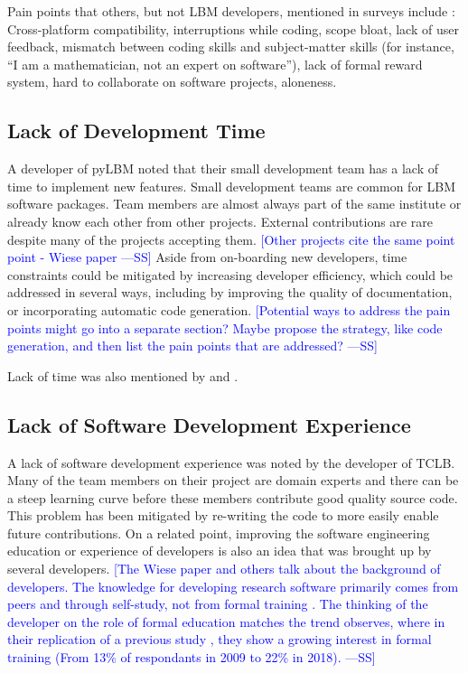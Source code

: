 \documentclass[final, 3p, times, authoryear]{elsarticle}
\newcommand{\authornote}[3]{\textcolor{#1}{[#3 ---#2]}}
\newcommand{\authornote}[3]{}
\newcommand{\wss}[1]{\authornote{blue}{SS}{#1}} %
\begin{document}
Pain points that others, but not LBM developers, mentioned in surveys include
\citep{PintoEtAl2018}: Cross-platform compatibility, interruptions while coding,
scope bloat, lack of user feedback, mismatch between coding skills and
subject-matter skills (for instance, ``I am a mathematician, not an expert on
software''), lack of formal reward system, hard to collaborate on software
projects, aloneness.

\subsection{Lack of Development Time}

A developer of pyLBM noted that their small development team has a lack of time
to implement new features. Small development teams are common for LBM software
packages. Team members are almost always part of the same institute or already
know each other from other projects. External contributions are rare despite
many of the projects accepting them. \wss{Other projects cite the same point
point - Wiese paper}  Aside from on-boarding new developers, time constraints
could be mitigated by increasing developer efficiency, which could be addressed
in several ways, including by improving the quality of documentation, or
incorporating automatic code generation. \wss{Potential ways to address the pain
points might go into a separate section?  Maybe propose the strategy, like code
generation, and then list the pain points that are addressed?}

Lack of time was also mentioned by \citet{PintoEtAl2018} and
\citet{PintoEtAl2016}.

\subsection{Lack of Software Development Experience}

A lack of software development experience was noted by the developer of TCLB.
Many of the team members on their project are domain experts and there can be a
steep learning curve before these members contribute good quality source code.
This problem has been mitigated by re-writing the code to more easily enable
future contributions.  On a related point, improving the software engineering
education or experience of developers is also an idea that was brought up by
several developers.  \wss{The Wiese paper and others talk about the background
of developers. The knowledge for developing research software primarily comes
from peers and through self-study, not from formal training
\citep{HannayEtAl2009}.  The thinking of the developer on the role of formal education matches the trend \citet{PintoEtAl2018} observes, where in their replication of a previous study \citep{HannayEtAl2009}, they show a growing interest in formal training (From 13\% of respondants in 2009 to 22\% in 2018).}
\end{document}
